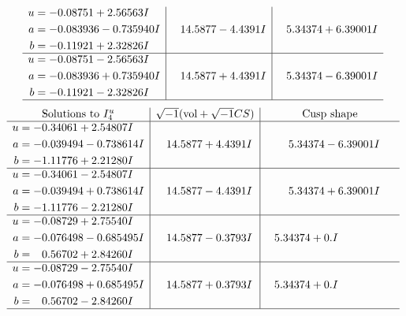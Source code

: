 \documentclass[1p]{elsarticle_modified}
\theoremstyle{definition}
\newcommand{\I}{\sqrt{-1}}
\begin{document}
$$\begin{array}{c|c|c}
\begin{aligned}
u &= -0.08751 + 2.56563 I \\
a &= -0.083936 - 0.735940 I \\
b &= -0.11921 + 2.32826 I\end{aligned}
 & \phantom{-}14.5877 - 4.4391 I & \phantom{-}5.34374 + 6.39001 I \\ \hline\begin{aligned}
u &= -0.08751 - 2.56563 I \\
a &= -0.083936 + 0.735940 I \\
b &= -0.11921 - 2.32826 I\end{aligned}
 & \phantom{-}14.5877 + 4.4391 I & \phantom{-}5.34374 - 6.39001 I\\
 \hline 
 \end{array}$$\newpage$$\begin{array}{c|c|c}  
\text{Solutions to }I^u_{4}& \I (\text{vol} + \sqrt{-1}CS) & \text{Cusp shape}\\
 \hline 
\begin{aligned}
u &= -0.34061 + 2.54807 I \\
a &= -0.039494 - 0.738614 I \\
b &= -1.11776 + 2.21280 I\end{aligned}
 & \phantom{-}14.5877 + 4.4391 I & \phantom{-}5.34374 - 6.39001 I \\ \hline\begin{aligned}
u &= -0.34061 - 2.54807 I \\
a &= -0.039494 + 0.738614 I \\
b &= -1.11776 - 2.21280 I\end{aligned}
 & \phantom{-}14.5877 - 4.4391 I & \phantom{-}5.34374 + 6.39001 I \\ \hline\begin{aligned}
u &= -0.08729 + 2.75540 I \\
a &= -0.076498 - 0.685495 I \\
b &= \phantom{-}0.56702 + 2.84260 I\end{aligned}
 & \phantom{-}14.5877 - 0.3793 I & \phantom{-}5.34374 + 0. I\phantom{ +0.000000I} \\ \hline\begin{aligned}
u &= -0.08729 - 2.75540 I \\
a &= -0.076498 + 0.685495 I \\
b &= \phantom{-}0.56702 - 2.84260 I\end{aligned}
 & \phantom{-}14.5877 + 0.3793 I & \phantom{-}5.34374 + 0. I\phantom{ +0.000000I}\\
 \hline 
 \end{array}$$\newpage\newpage\renewcommand{\arraystretch}{1}
\end{document}
